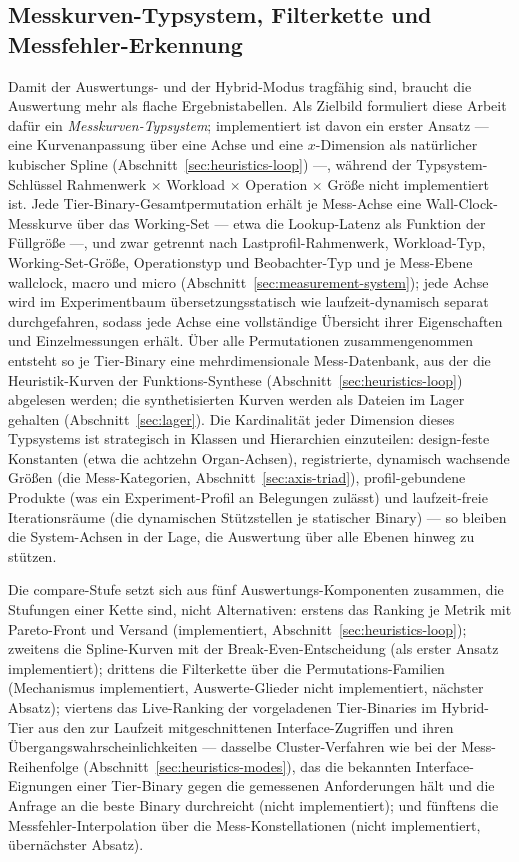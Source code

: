 \begin{nurlang}
\subsection{Messkurven-Typsystem, Filterkette und Messfehler-Erkennung}\label{sec:heuristics-curves}
Damit der Auswertungs- und der Hybrid-Modus tragfähig sind, braucht die Auswertung mehr als flache
Ergebnistabellen. Als Zielbild formuliert diese Arbeit dafür ein \emph{Messkurven-Typsystem}; implementiert ist
davon ein erster Ansatz --- eine Kurvenanpassung über eine Achse und eine $x$-Dimension als natürlicher kubischer
Spline (Abschnitt~\ref{sec:heuristics-loop}) ---, während der Typsystem-Schlüssel Rahmenwerk $\times$
Workload $\times$ Operation $\times$ Größe nicht implementiert ist. Jede Tier-Binary-Gesamtpermutation erhält
je Mess-Achse eine Wall-Clock-Messkurve über das Working-Set --- etwa die Lookup-Latenz als Funktion der
Füllgröße ---, und zwar getrennt nach Lastprofil-Rahmenwerk, Workload-Typ, Working-Set-Größe,
Operationstyp und Beobachter-Typ und je Mess-Ebene wallclock, macro und micro
(Abschnitt~\ref{sec:measurement-system}); jede Achse wird im Experimentbaum übersetzungsstatisch wie
laufzeit-dynamisch separat durchgefahren, sodass jede Achse eine vollständige Übersicht ihrer
Eigenschaften und Einzelmessungen erhält. Über alle Permutationen zusammengenommen entsteht so je
Tier-Binary eine mehrdimensionale Mess-Datenbank, aus der die Heuristik-Kurven der Funktions-Synthese
(Abschnitt~\ref{sec:heuristics-loop}) abgelesen werden; die synthetisierten Kurven werden als Dateien im
Lager gehalten (Abschnitt~\ref{sec:lager}). Die Kardinalität jeder Dimension dieses
Typsystems ist strategisch in Klassen und Hierarchien einzuteilen: design-feste Konstanten (etwa die
achtzehn Organ-Achsen), registrierte, dynamisch wachsende Größen (die Mess-Kategorien,
Abschnitt~\ref{sec:axis-triad}), profil-gebundene Produkte (was ein Experiment-Profil an Belegungen
zulässt) und laufzeit-freie Iterationsräume (die dynamischen Stützstellen je statischer Binary) --- so
bleiben die System-Achsen in der Lage, die Auswertung über alle Ebenen hinweg zu stützen.

Die compare-Stufe setzt sich aus fünf Auswertungs-Komponenten zusammen, die Stufungen einer Kette sind,
nicht Alternativen: erstens das Ranking je Metrik mit Pareto-Front und Versand (implementiert,
Abschnitt~\ref{sec:heuristics-loop}); zweitens die Spline-Kurven mit der Break-Even-Entscheidung (als
erster Ansatz implementiert); drittens die Filterkette über die Permutations-Familien (Mechanismus implementiert,
Auswerte-Glieder nicht implementiert, nächster Absatz); viertens das Live-Ranking der vorgeladenen Tier-Binaries im
Hybrid-Tier aus den zur Laufzeit mitgeschnittenen Interface-Zugriffen und ihren
Übergangswahrscheinlichkeiten --- dasselbe Cluster-Verfahren wie bei der Mess-Reihenfolge
(Abschnitt~\ref{sec:heuristics-modes}), das die bekannten Interface-Eignungen einer Tier-Binary gegen die
gemessenen Anforderungen hält und die Anfrage an die beste Binary durchreicht (nicht implementiert); und
fünftens die Messfehler-Interpolation über die Mess-Konstellationen (nicht implementiert, übernächster Absatz).


\end{nurlang}
